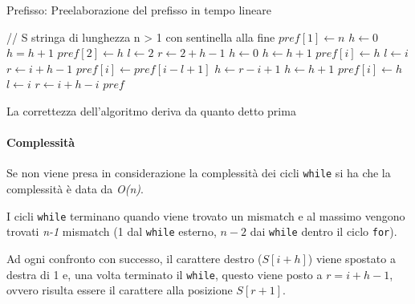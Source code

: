 \begin{breakablealgorithm}
	\caption{Prefisso: Preelaborazione del prefisso in tempo lineare}
	\begin{algorithmic}[1]
		    \State // S stringa di lunghezza n > 1 con sentinella alla fine
		    \State $ pref[1] \gets n $  
		    \State $ h \gets 0 $
		        \State $ h = h +1 $
		    \EndWhile
		    \State $ pref[2] \gets h $
		    \State  $ l \gets 2 $
		    \State $ r \gets 2 + h - 1$
			     
			        \State $ h \gets 0$
		                \State $ h \gets h + 1 $
		            \EndWhile
		            \State $ pref[i] \gets h$
		            \State $ l \gets i $
		            \State $ r \gets i + h -1 $
		        \Else {}
				     
		                \State $pref[i] \gets pref[i - l +1]$
		            \Else {}
		               \State $h \gets r - i +1$
		                    \State $ h \gets h +1 $
		                \EndWhile
		                \State $pref[i] \gets h$
		                \State $l \gets i$
		                \State $ r \gets i +h -i$
			         \EndIf
		          \EndIf
		    \EndFor
		    \State \Return $ pref $
		   \EndFunction
	\end{algorithmic}
\end{breakablealgorithm}

La correttezza dell'algoritmo deriva da quanto detto prima

\paragraph{Complessità}\label{complessituxe0}

Se non viene presa in considerazione la complessità dei cicli
\texttt{while} si ha che la complessità è data da \emph{O(n)}.

I cicli \texttt{while} terminano quando viene trovato un mismatch e al
massimo vengono trovati \emph{n-1} mismatch (1 dal \texttt{while}
esterno, $n-2$ dai \texttt{while} dentro il ciclo \texttt{for}).

Ad ogni confronto con successo, il carattere destro ($S[i+h]$)
viene spostato a destra di 1 e, una volta terminato il \texttt{while}, questo viene posto a $r = i + h - 1$, ovvero risulta essere il carattere alla posizione $S[r+1]$.

